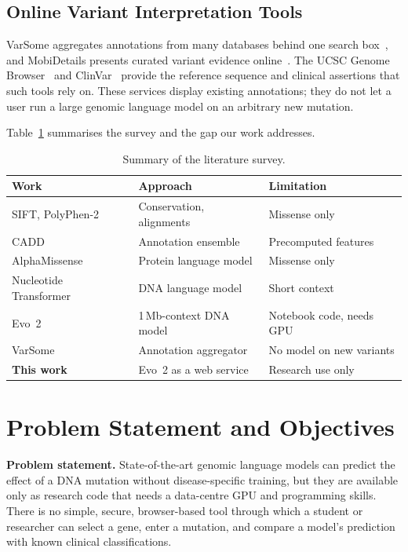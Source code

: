 \documentclass[conference,a4paper]{IEEEtran}
\begin{document}
\subsection{Online Variant Interpretation Tools}
VarSome aggregates annotations from many databases behind one search box~\cite{vandenbroucke2019varsome}, and MobiDetails presents curated variant evidence online~\cite{baux2021mobidetails}. The UCSC Genome Browser~\cite{lee2022ucsc} and ClinVar~\cite{landrum2024clinvar} provide the reference sequence and clinical assertions that such tools rely on. These services display existing annotations; they do not let a user run a large genomic language model on an arbitrary new mutation.

Table~\ref{tab:lit} summarises the survey and the gap our work addresses.

\begin{table}[!t]
\caption{Summary of the literature survey.}
\label{tab:lit}
\centering
\footnotesize
\begin{tabular}{@{}p{2.3cm}p{2.6cm}p{2.6cm}@{}}
\toprule
Work & Approach & Limitation \\
\midrule
SIFT, PolyPhen-2~\cite{ng2001sift,adzhubei2010polyphen2} & Conservation, alignments & Missense only \\
CADD~\cite{rentzsch2019cadd} & Annotation ensemble & Precomputed features \\
AlphaMissense~\cite{cheng2023alphamissense} & Protein language model & Missense only \\
Nucleotide Transformer~\cite{dallatorre2024nt} & DNA language model & Short context \\
Evo~2~\cite{brixi2026evo2} & 1\,Mb-context DNA model & Notebook code, needs GPU \\
VarSome~\cite{vandenbroucke2019varsome} & Annotation aggregator & No model on new variants \\
\midrule
\textbf{This work} & Evo~2 as a web service & Research use only \\
\bottomrule
\end{tabular}
\end{table}

\section{Problem Statement and Objectives}
\label{sec:obj}

\textbf{Problem statement.} State-of-the-art genomic language models can predict the effect of a DNA mutation without disease-specific training, but they are available only as research code that needs a data-centre GPU and programming skills. There is no simple, secure, browser-based tool through which a student or researcher can select a gene, enter a mutation, and compare a model's prediction with known clinical classifications.
\end{document}
